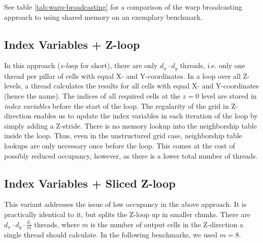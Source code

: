 See table \ref{tab:warp-broadcasting} for a comparison of the warp broadcasting approach to using shared memory on an exemplary benchmark.

\subsection{Index Variables + Z-loop} In this approach (\emph{z-loop} for short), there are only $d_x\cdot d_y$ threads, i.e. only one thread per pillar of cells with equal X- and Y-coordinates. In a loop over all Z-levels, a thread calculates the results for all cells with equal X- and Y-coordinates (hence the name). The indices of all required cells at the $z=0$ level are stored in \emph{index variables} before the start of the loop. The regularity of the grid in Z-direction enables us to update the index variables in each iteration of the loop by simply adding a Z-stride. There is no memory lookup into the neighborship table inside the loop. Thus, even in the unstructured grid case, neighborship table lookups are only necessary once before the loop. This comes at the cost of possibly reduced occupancy, however, as there is a lower total number of threads.

\subsection{Index Variables + Sliced Z-loop} This variant addresses the issue of low occupancy in the above approach. It is practically identical to it, but splits the Z-loop up in smaller chunks. There are $d_x\cdot d_y\cdot \frac{d_z}{m}$ threads, where $m$ is the number of output cells in the Z-direction a single thread should calculate. In the following benchmarks, we used $m=8$.


